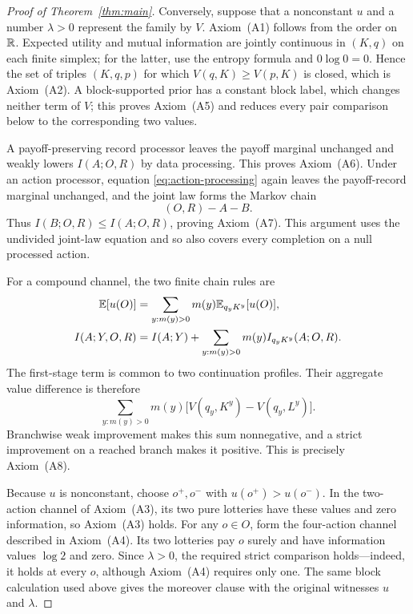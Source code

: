 \begin{proof}[Proof of Theorem~\ref{thm:main}]
Conversely, suppose that a nonconstant $u$ and a number $\lambda>0$ represent
the family by $V$.  Axiom~\textup{(A1)} follows from the order on $\mathbb R$.
Expected utility and mutual information are jointly continuous in $(K,q)$ on
each finite simplex; for the latter, use the entropy formula and $0\log0=0$.
Hence the set of triples $(K,q,p)$ for which $V(q,K)\ge V(p,K)$ is closed,
which is Axiom~\textup{(A2)}.  A block-supported prior has a constant block
label, which changes neither term of $V$; this proves Axiom~\textup{(A5)} and
reduces every pair comparison below to the corresponding two values.

A payoff-preserving record processor leaves the payoff marginal unchanged and
weakly lowers $I(A;O,R)$ by data processing.  This proves
Axiom~\textup{(A6)}.  Under an action processor, equation
\eqref{eq:action-processing} again leaves the payoff-record marginal unchanged,
and the joint law forms the Markov chain
\[
(O,R)-A-B.
\]
Thus $I(B;O,R)\le I(A;O,R)$, proving Axiom~\textup{(A7)}.  This argument uses
the undivided joint-law equation and so also covers every completion on a null
processed action.

For a compound channel, the two finite chain rules are
\begin{align*}
\mathbb E[u(O)]
  &=\sum_{y:m(y)>0} m(y)\mathbb E_{q_yK^y}[u(O)],\\
I(A;Y,O,R)
  &=I(A;Y)+\sum_{y:m(y)>0} m(y)I_{q_yK^y}(A;O,R).
\end{align*}
The first-stage term is common to two continuation profiles.  Their aggregate
value difference is therefore
\[
\sum_{y:m(y)>0} m(y)\bigl[V(q_y,K^y)-V(q_y,L^y)\bigr].
\]
Branchwise weak improvement makes this sum nonnegative, and a strict
improvement on a reached branch makes it positive.  This is precisely
Axiom~\textup{(A8)}.

Because $u$ is nonconstant, choose $o^+,o^-$ with $u(o^+)>u(o^-)$.  In the
two-action channel of Axiom~\textup{(A3)}, its two pure lotteries have these
values and zero information, so Axiom~\textup{(A3)} holds.  For any $o\in O$,
form the four-action channel described in Axiom~\textup{(A4)}.  Its two
lotteries pay $o$ surely and have information values $\log2$ and zero.  Since
$\lambda>0$, the required strict comparison holds---indeed, it holds at every
$o$, although Axiom~\textup{(A4)} requires only one.  The same block calculation used above gives the moreover
clause with the original witnesses $u$ and $\lambda$.
\end{proof}
